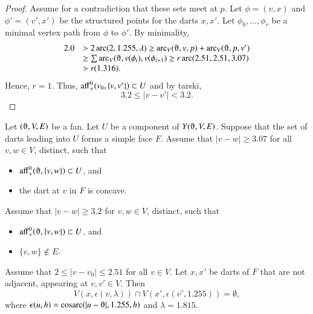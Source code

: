 \begin{proof}
Assume for a contradiction that these sets meet at $p$.
Let $\phi=(v,x)$ and $\phi'=(v',x')$ be the structured points for
the darts $x,x'$.  Let $\phi_0,\ldots,\phi_r$ be a minimal vertex
path from $\phi$ to $\phi'$.  By minimality,
$$
\begin{array}{lll}
 2.0 &> 2\arc(2,1.255,\lambda) \ge \arc_V(\orgn,v,p) +
\arc_V(\orgn,p,v') \\
  &\ge \sum \arc_V(\orgn,v(\phi_i),v(\phi_{i+1})\ge
  r \arc(2.51,2.51,3.07)\\ 
  &> r (1.316).
\end{array}
$$
Hence, $r=1$.
Thus, ${\operatorname{aff}}_+^0(v_0,\{v,v'\})\subset U$ and by tarski,
$$
  3.2 \le |v-v'| < 3.2.
$$
\end{proof}


 
\begin{lemma}
Let $(\orgn,V,E)$ be a fan.  Let $U$ be a component of $Y(\orgn,V,E)$.
Suppose that the set of darts leading into $U$ forms a simple face $F$.
Assume that $|v-w|\ge 3.07$ for all $v,w\in V$, distinct, such that
  \begin{itemize}
   \item $\op{aff}_+^0(\orgn,\{v,w\})\subset U$, and
   \item the dart at $v$ in $F$ is concave.
  \end{itemize}
Assume that $|v-w|\ge 3.2$ for $v,w\in V$, distinct, such that
  \begin{itemize}
   \item $\op{aff}_+^0(\orgn,\{v,w\})\subset U$, and
   \item $\{v,w\}\not\in E$.  %
  \end{itemize}
Assume that $2\le |v-v_0|\le 2.51$ for all $v\in V$.
Let $x,x'$ be darts of $F$ that are not adjacent, appearing at $v,v'\in V$.  
Then
$$
V(x,\epsilon(v,\lambda))\cap V(x',\epsilon(v',1.255)) = \emptyset,
$$
where $\epsilon(u,h) = \cosarc(|u-\orgn|,1.255,h)$ and $\lambda=1.815$.
\end{lemma}


